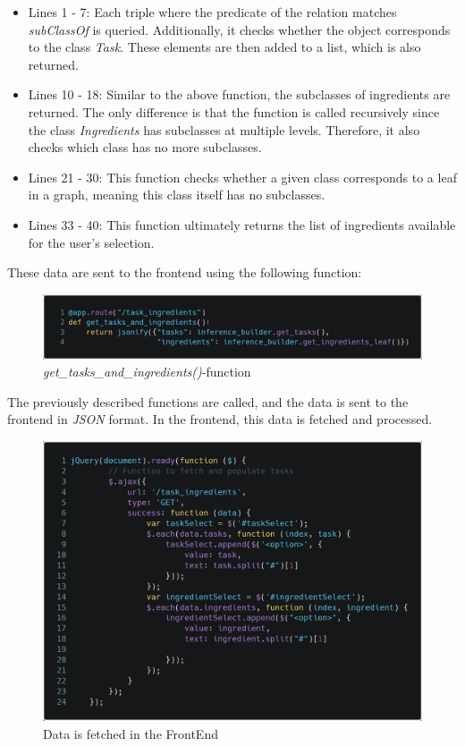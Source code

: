 \begin{itemize}
    \item Lines 1 - 7: Each triple where the predicate of the relation matches \textit{subClassOf} is queried. Additionally, it checks whether the object corresponds to the class \textit{Task}. These elements are then added to a list, which is also returned.
    \item Lines 10 - 18: Similar to the above function, the subclasses of ingredients are returned. The only difference is that the function is called recursively since the class \textit{Ingredients} has subclasses at multiple levels. Therefore, it also checks which class has no more subclasses.
    \item Lines 21 - 30: This function checks whether a given class corresponds to a leaf in a graph, meaning this class itself has no subclasses.
    \item Lines 33 - 40: This function ultimately returns the list of ingredients available for the user's selection.
\end{itemize}

These data are sent to the frontend using the following function:

\begin{figure}[H]
    \includegraphics[scale=0.25]{Graphics/inference_main.png}
    \caption{\textit{get\_tasks\_and\_ingredients()}-function}
\end{figure}

The previously described functions are called, and the data is sent to the frontend in \textit{JSON} format. In the frontend, this data is fetched and processed.

\begin{figure}[H]
    \includegraphics[scale=0.22]{Graphics/inference_frontend_fetch.png}
    \caption{Data is fetched in the FrontEnd}
\end{figure}


